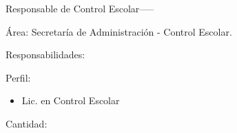 \begin{actor}{Responsable de Control Escolar}{-----}
	
	\item[Área:] Secretaría de Administración - Control Escolar.
	
	\item[Responsabilidades:] \hspace{1pt}
	\item[Perfil:] \hspace{1pt}
	\begin{itemize}
		\item Lic. en Control Escolar
	\end{itemize}
	\item[Cantidad:] %
\end{actor}


%	
%	

